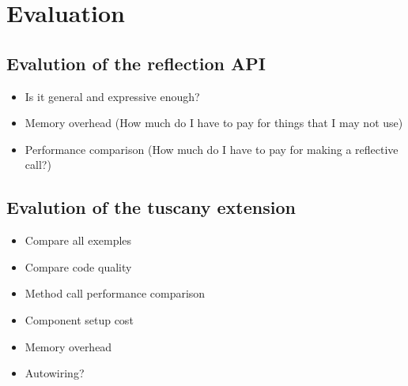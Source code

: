 \chapter{Evaluation}

\section{Evalution of the reflection API}

\begin{itemize}
 \item Is it general and expressive enough?
 \item Memory overhead (How much do I have to pay for things that I may not use)
 \item Performance comparison (How much do I have to pay for making a reflective call?)
\end{itemize}


\section{Evalution of the tuscany extension}

\begin{itemize}
 \item Compare all exemples
 \item Compare code quality
 \item Method call performance comparison
 \item Component setup cost
 \item Memory overhead
 \item Autowiring?
\end{itemize}